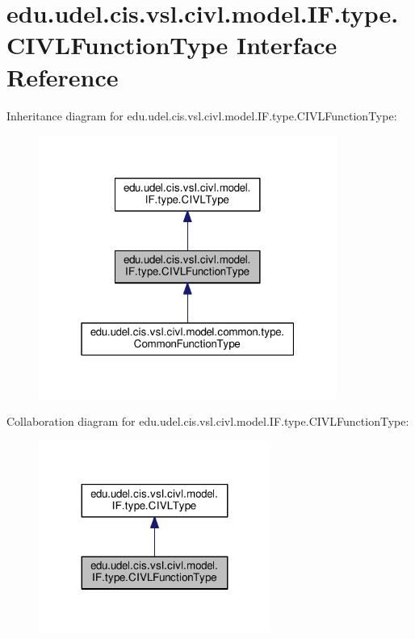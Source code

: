 \hypertarget{interfaceedu_1_1udel_1_1cis_1_1vsl_1_1civl_1_1model_1_1IF_1_1type_1_1CIVLFunctionType}{}\section{edu.\+udel.\+cis.\+vsl.\+civl.\+model.\+I\+F.\+type.\+C\+I\+V\+L\+Function\+Type Interface Reference}
\label{interfaceedu_1_1udel_1_1cis_1_1vsl_1_1civl_1_1model_1_1IF_1_1type_1_1CIVLFunctionType}


Inheritance diagram for edu.\+udel.\+cis.\+vsl.\+civl.\+model.\+I\+F.\+type.\+C\+I\+V\+L\+Function\+Type\+:
\nopagebreak
\begin{figure}[H]
\begin{center}
\leavevmode
\includegraphics[width=277pt]{interfaceedu_1_1udel_1_1cis_1_1vsl_1_1civl_1_1model_1_1IF_1_1type_1_1CIVLFunctionType__inherit__graph}
\end{center}
\end{figure}


Collaboration diagram for edu.\+udel.\+cis.\+vsl.\+civl.\+model.\+I\+F.\+type.\+C\+I\+V\+L\+Function\+Type\+:
\nopagebreak
\begin{figure}[H]
\begin{center}
\leavevmode
\includegraphics[width=215pt]{interfaceedu_1_1udel_1_1cis_1_1vsl_1_1civl_1_1model_1_1IF_1_1type_1_1CIVLFunctionType__coll__graph}
\end{center}
\end{figure}
